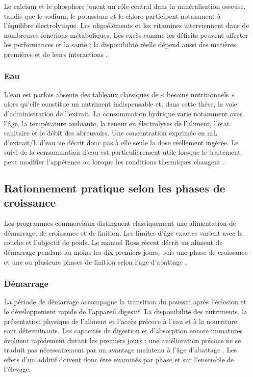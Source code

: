 Le calcium et le phosphore jouent un rôle central dans la minéralisation osseuse, tandis que le sodium, le potassium et le chlore participent notamment à l'équilibre électrolytique. Les oligoéléments et les vitamines interviennent dans de nombreuses fonctions métaboliques. Les excès comme les déficits peuvent affecter les performances et la santé ; la disponibilité réelle dépend aussi des matières premières et de leurs interactions \citep{Aviagen2022}.

\subsubsection{Eau}

L'eau est parfois absente des tableaux classiques de « besoins nutritionnels » alors qu'elle constitue un nutriment indispensable et, dans cette thèse, la voie d'administration de l'extrait. La consommation hydrique varie notamment avec l'âge, la température ambiante, la teneur en électrolytes de l'aliment, l'état sanitaire et le débit des abreuvoirs. Une concentration exprimée en mL d'extrait/L d'eau ne décrit donc pas à elle seule la dose réellement ingérée. Le suivi de la consommation d'eau est particulièrement utile lorsque le traitement peut modifier l'appétence ou lorsque les conditions thermiques changent \citep{Aviagen2025,Correa2026}.

\subsection{Rationnement pratique selon les phases de croissance}

Les programmes commerciaux distinguent classiquement une alimentation de démarrage, de croissance et de finition. Les limites d'âge exactes varient avec la souche et l'objectif de poids. Le manuel Ross récent décrit un aliment de démarrage pendant au moins les dix premiers jours, puis une phase de croissance et une ou plusieurs phases de finition selon l'âge d'abattage \citep{Aviagen2025}.

\subsubsection{Démarrage}

La période de démarrage accompagne la transition du poussin après l'éclosion et le développement rapide de l'appareil digestif. La disponibilité des nutriments, la présentation physique de l'aliment et l'accès précoce à l'eau et à la nourriture sont déterminants. Les capacités de digestion et d'absorption encore immatures évoluent rapidement durant les premiers jours ; une amélioration précoce ne se traduit pas nécessairement par un avantage maintenu à l'âge d'abattage \citep{RavindranAbdollahi2021}. Les effets d'un additif doivent donc être examinés par phase et sur l'ensemble de l'élevage.

